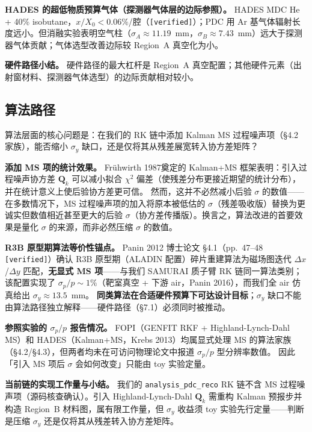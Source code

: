 \documentclass[a4paper, 11pt]{article}
\begin{document}
\textbf{HADES 的超低物质预算气体（探测器气体层的边际参照）。}
HADES MDC He + 40\% isobutane，$x/X_0 < 0.06\%$/腔（\texttt{[verified]}）；PDC 用 Ar 基气体辐射长度远小。但消融实验表明空气柱（$\sigma_A \approx 11.19$~mm，$\sigma_B \approx 7.43$~mm）远大于探测器气体贡献；气体选型改善边际较 Region~A 真空化为小。

\textbf{硬件路径小结。}
硬件路径的最大杠杆是 Region~A 真空配置；其他硬件元素（出射窗材料、探测器气体选型）的边际贡献相对较小。

\subsection{算法路径}
\label{sec:impl_algorithm}

算法层面的核心问题是：在我们的 RK 链中添加 Kalman MS 过程噪声项（§4.2 家族），能否缩小 $\sigma_y$ 缺口，还是仅将其从残差展宽转入协方差矩阵？

\textbf{添加 MS 项的统计效果。}
Frühwirth 1987奠定的 Kalman+MS 框架表明：引入过程噪声协方差 $\mathbf{Q}_k$ 可以减小拟合 $\chi^2$ 偏差（使残差分布更接近期望的统计分布），并在统计意义上使后验协方差更可信。
然而，这并不必然减小后验 $\sigma$ 的数值——在多数情况下，MS 过程噪声项的加入将原本被低估的 $\sigma$（残差吸收版）替换为更诚实但数值相近甚至更大的后验 $\sigma$（协方差传播版）。换言之，算法改进的首要效果是量化 $\sigma$ 的来源，而非必然压缩 $\sigma$ 的数值。

\textbf{R3B 原型期算法等价性锚点。}
Panin 2012 博士论文 §4.1（pp.~47--48 \texttt{[verified]}）确认 R3B 原型期（ALADIN 配置）碎片重建算法为磁场图迭代 $\Delta x$/$\Delta y$ 匹配，\textbf{无显式 MS 项}——与我们 SAMURAI 质子臂 RK 链同一算法类别；该配置实现了 $\sigma_p/p \sim 1\%$（靶室真空 + 下游 air，Panin 2016），而我们全 air 仿真给出 $\sigma_y \approx 13.5$~mm。
\textbf{同类算法在合适硬件预算下可达设计目标}；$\sigma_y$ 缺口不能由算法路径独立解释——硬件路径（§7.1）必须同时被推动。

\textbf{参照实验的 $\sigma_p/p$ 报告情况。}
FOPI（GENFIT RKF + Highland-Lynch-Dahl MS）和 HADES（Kalman+MS，Krebs 2013）均属显式处理 MS 的算法家族（§4.2/§4.3），但两者均未在可访问物理论文中报道 $\sigma_p/p$ 型分辨率数值。
因此「引入 MS 项后 $\sigma$ 会如何改变」只能由 toy 实验定量。

\textbf{当前链的实现工作量与小结。}
我们的 \texttt{analysis\_pdc\_reco} RK 链不含 MS 过程噪声项（源码核查确认）。引入 Highland-Lynch-Dahl $\mathbf{Q}_k$ 需重构 Kalman 预报步并构造 Region~B 材料图，属有限工作量，但 $\sigma_y$ 收益须 toy 实验先行定量——判断是压缩 $\sigma_y$ 还是仅将其从残差转入协方差矩阵。
\end{document}
